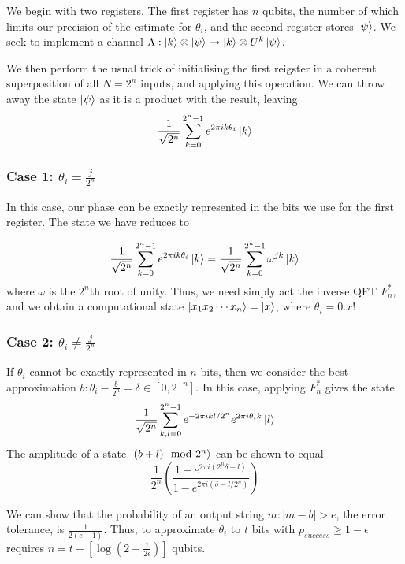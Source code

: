 \documentclass[11pt]{article}
\begin{document}
We begin with two registers. The first register has $n$ qubits, the number of which limits our precision of the estimate for $\theta_{i}$, and the second register stores $\ket{\psi}$. We seek to implement a channel $\Lambda: \ket{k}\otimes\ket{\psi} \rightarrow \ket{k}\otimes U^{k}\ket{\psi}$.

We then perform the usual trick of initialising the first reigster in a coherent superposition of all $N=2^{n}$ inputs, and applying this operation. We can throw away the state $\ket{\psi}$ as it is a product with the result, leaving
\begin{equation}
    \frac{1}{\sqrt{2^{n}}}\sum_{k=0}^{2^{n} -1}e^{2\pi i k \theta_{i}}\ket{k}
\end{equation}

\subsubsection*{Case 1: $\theta_{i} = \frac{j}{2^{n}}$}
In this case, our phase can be exactly represented in the bits we use for the first register. The state we have reduces to

\begin{equation}
    \frac{1}{\sqrt{2^{n}}}\sum_{k=0}^{2^{n} -1}e^{2\pi i k \theta_{i}}\ket{k} =
    \frac{1}{\sqrt{2^{n}}}\sum_{k=0}^{2^{n} -1}\omega^{jk}\ket{k}
\end{equation}
where $\omega$ is the $2^{n}$th root of unity. Thus, we need simply act the inverse QFT $F_{n}^{*}$, and we obtain a computational state $\ket{x_{1}x_{2}\cdots x_{n}}=\ket{x}$, where $\theta_{i}=0.x$!

\subsubsection*{Case 2: $\theta_{i}\neq \frac{j}{2^{n}}$}

If $\theta_{i}$ cannot be exactly represented in $n$ bits, then we consider the best approximation $b:\theta_{i}-\frac{b}{2^{n}} = \delta \in[0,2^{-n}]$. In this case, applying $F^{*}_{n}$ gives the state
\begin{equation}
    \frac{1}{\sqrt{2^{n}}}\sum_{k,l=0}^{2^{n} -1}
    e^{-2\pi i k l /2^{n}} e^{2\pi i \theta_i k}\ket{l}
\end{equation}
The amplitude of a state $\ket{(b+l)\mod 2^{n}}$ can be shown to equal
\[\frac{1}{2^{n}}(\frac{1-e^{2\pi i (2^{n}\delta - l)}}{1-e^{2\pi i (\delta - l/2^{n})}})\]

We can show that the probability of an output string $m:\vert m-b\vert > e$, the error tolerance, is $\frac{1}{2(e-1)}$. Thus, to approximate $\theta_{i}$ to $t$ bits with $p_{success}\geq 1-\epsilon$ requires $n = t + [\log(2+\frac{1}{2\epsilon})]$ qubits.
\end{document}
